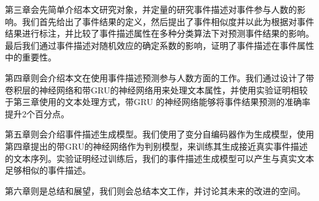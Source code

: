 第三章会先简单介绍本文研究对象，并定量的研究事件描述对事件参与人数的影响。我们首先给出了事件结果的定义，然后提出了事件相似度并以此为根据对事件结果进行标注，并比较了事件描述属性在多种分类算法下对预测事件结果的影响。最后我们通过事件描述对随机效应的确定系数的影响，证明了事件描述在事件属性中的重要性。

第四章则会介绍本文在使用事件描述预测参与人数方面的工作。我们通过设计了带卷积层的神经网络和带GRU的神经网络用来处理文本属性，并使用实验证明相较于第三章使用的文本处理方式，带GRU 的神经网络能够将事件结果预测的准确率提升2个百分点。

第五章则会介绍事件描述生成模型。我们使用了变分自编码器作为生成模型，使用第四章提出的带GRU的神经网络作为判别模型，来训练其生成接近真实事件描述的文本序列。实验证明经过训练后，我们的事件描述生成模型可以产生与真实文本足够相似的事件描述。

第六章则是总结和展望，我们则会总结本文工作，并讨论其未来的改进的空间。


%  

